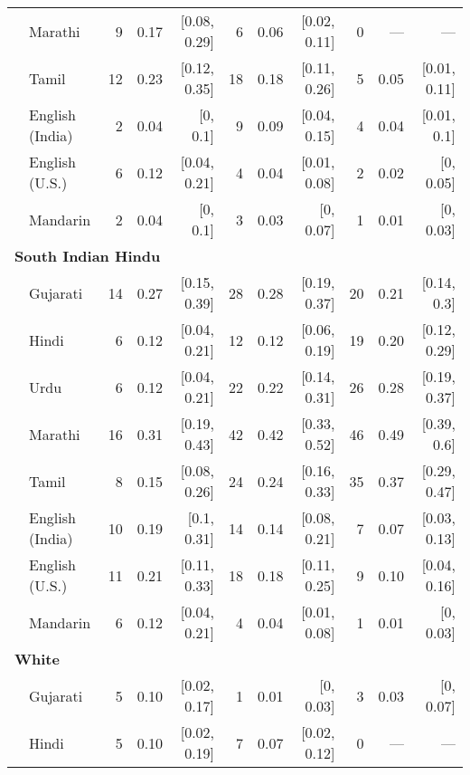 \begin{table}[t]
\begin{footnotesize}
\begin{tabular}{p{.1in}lrrrrrrrrr}
 & Marathi & 9 & 0.17 & [0.08, 0.29] & 6 & 0.06 & [0.02, 0.11] & 0 & --- & ---\\

 & Tamil & 12 & 0.23 & [0.12, 0.35] & 18 & 0.18 & [0.11, 0.26] & 5 & 0.05 & [0.01, 0.11]\\

 & English (India) & 2 & 0.04 & [0, 0.1] & 9 & 0.09 & [0.04, 0.15] & 4 & 0.04 & [0.01, 0.1]\\

 & English (U.S.) & 6 & 0.12 & [0.04, 0.21] & 4 & 0.04 & [0.01, 0.08] & 2 & 0.02 & [0, 0.05]\\

& Mandarin & 2 & 0.04 & [0, 0.1] & 3 & 0.03 & [0, 0.07] & 1 & 0.01 & [0, 0.03]\\
\midrule
\multicolumn{11}{l}{\textbf{South Indian Hindu}}\\
& Gujarati & 14 & 0.27 & [0.15, 0.39] & 28 & 0.28 & [0.19, 0.37] & 20 & 0.21 & [0.14, 0.3]\\

 & Hindi & 6 & 0.12 & [0.04, 0.21] & 12 & 0.12 & [0.06, 0.19] & 19 & 0.20 & [0.12, 0.29]\\

 & Urdu & 6 & 0.12 & [0.04, 0.21] & 22 & 0.22 & [0.14, 0.31] & 26 & 0.28 & [0.19, 0.37]\\

 & Marathi & 16 & 0.31 & [0.19, 0.43] & 42 & 0.42 & [0.33, 0.52] & 46 & 0.49 & [0.39, 0.6]\\

 & Tamil & 8 & 0.15 & [0.08, 0.26] & 24 & 0.24 & [0.16, 0.33] & 35 & 0.37 & [0.29, 0.47]\\

 & English (India) & 10 & 0.19 & [0.1, 0.31] & 14 & 0.14 & [0.08, 0.21] & 7 & 0.07 & [0.03, 0.13]\\

 & English (U.S.) & 11 & 0.21 & [0.11, 0.33] & 18 & 0.18 & [0.11, 0.25] & 9 & 0.10 & [0.04, 0.16]\\

& Mandarin & 6 & 0.12 & [0.04, 0.21] & 4 & 0.04 & [0.01, 0.08] & 1 & 0.01 & [0, 0.03]\\
\midrule
\multicolumn{11}{l}{\textbf{White}}\\
 & Gujarati & 5 & 0.10 & [0.02, 0.17] & 1 & 0.01 & [0, 0.03] & 3 & 0.03 & [0, 0.07]\\

 & Hindi & 5 & 0.10 & [0.02, 0.19] & 7 & 0.07 & [0.02, 0.12] & 0 & --- & ---\\


\end{tabular}
\end{footnotesize}
\end{table}
